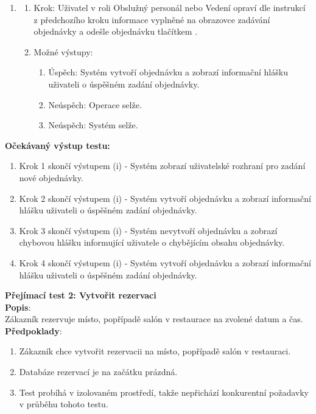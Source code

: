 \begin{enumerate}
	\item 
	\begin{enumerate}
		\item Krok: Uživatel v roli Obslužný personál nebo Vedení opraví dle instrukcí z předchozího kroku informace vyplněné na obrazovce zadávání objednávky a odešle objednávku tlačítkem .
		\item Možné výstupy:
		\begin{enumerate}
			\item Úspěch: Systém vytvoří objednávku a zobrazí informační hlášku uživateli o úspěšném zadání objednávky.
			\item Neúspěch: Operace selže.
			\item Neúspěch: Systém selže.
		\end{enumerate} 
	\end{enumerate}
\end{enumerate}

\newpage
\textbf{Očekávaný výstup testu:} \\
\begin{enumerate}
	\item Krok 1 skončí výstupem (i) - Systém zobrazí uživatelské rozhraní pro zadání nové objednávky.
	\item Krok 2 skončí výstupem (i) - Systém vytvoří objednávku a zobrazí informační hlášku uživateli o úspěšném zadání objednávky.
	\item Krok 3 skončí výstupem (i) - Systém nevytvoří objednávku a zobrazí chybovou hlášku informující uživatele o chybějícím obsahu objednávky.
	\item Krok 4 skončí výstupem (i) - Systém vytvoří objednávku a zobrazí informační hlášku uživateli o úspěšném zadání objednávky.
\end{enumerate}


{\large\textbf{Přejímací test 2: Vytvořit rezervaci}} \\
\textbf{Popis}: \\\indent Zákazník rezervuje místo, popřípadě salón v restaurace na zvolené datum a čas. \\

\textbf{Předpoklady}: 
\begin{enumerate}
	\item Zákazník chce vytvořit rezervacii na místo, popřípadě salón v restauraci.
	\item Databáze rezervací je na začátku prázdná.
	\item Test probíhá v izolovaném prostředí, takže nepřichází konkurentní požadavky v průběhu tohoto testu.
\end{enumerate}

